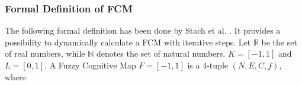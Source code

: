 \documentclass[conference]{IEEEtran}
\begin{document}
\subsubsection{Formal Definition of FCM}
The following formal definition has been done by Stach et al. \cite{stach2005}. It provides a possibility to dynamically calculate a FCM with iterative steps. Let \begin{math} \mathbb{R} \end{math} be the set of real numbers, while \begin{math} \mathbb{N} \end{math} denotes the set of natural numbers. \begin{math} K = [-1,1] \end{math} and \begin{math} L = [0,1] \end{math}. A Fuzzy Cognitive Map \begin{math} F = [-1,1] \end{math} is a 4-tuple \begin{math} (N,E,C,f) \end{math}, where
\end{document}
